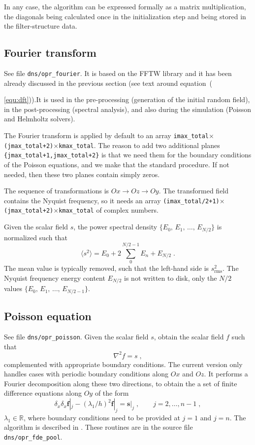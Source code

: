 In any case, the algorithm can be expressed formally as a matrix multiplication, the diagonals being calculated once in the initialization step and being stored in the filter-structure data.

\subsection{Fourier transform}

See file {\tt dns/opr\_fourier}. It is based on the FFTW library and it has been already discussed in the previous section (see text around equation~({\ref{equ:dft})).It is used in the pre-processing (generation of the   initial random field), in the post-processing (spectral analysis), and also during the simulation (Poisson and Helmholtz solvers).

The Fourier transform is applied by default to an array {\tt imax\_total}$\times${\tt(jmax\_total+2)}$\times${\tt kmax\_total}. The reason to add two additional planes {\tt \{jmax\_total+1,jmax\_total+2\}} is that we need them for the boundary conditions of the Poisson equations, and we make that the standard procedure. If not needed, then these two planes contain simply zeros.

The sequence of transformations is $Ox\rightarrow Oz\rightarrow Oy$. The transformed field contains the Nyquist frequency, so it needs an array {\tt(imax\_total/2+1)}$\times${\tt(jmax\_total+2)}$\times${\tt kmax\_total} of complex numbers.

Given the scalar field $s$, the power spectral density $\{E_0,\,E_1,\,\ldots,\,E_{N/2}\}$ is normalized such that
\begin{equation}
\langle s^2\rangle = E_0+2\sum_0^{N/2-1}E_n+E_{N/2} \;.
\end{equation}
The mean value is typically removed, such that the left-hand side is $s^2_\text{rms}$. The Nyquist frequency energy content $E_{N/2}$ is not written to disk, only the $N/2$ values $\{E_0,\,E_1,\,\ldots,\,E_{N/2-1}\}$.

\subsection{Poisson equation}

See file {\tt dns/opr\_poisson}. Given the scalar field $s$, obtain the scalar field $f$ such that
\begin{equation}
  \nabla^2 f= s \;,
\end{equation}
complemented with appropriate boundary conditions.  The current version only handles cases with periodic boundary conditions along $Ox$ and $Oz$. It performs a Fourier decomposition along these two directions, to obtain the a set of finite difference equations along $Oy$ of the form
\begin{equation}
  \delta_x \delta_x \mathbf{f}|_j - (\lambda_1/h)^2\mathbf{f}|_j=\mathbf{s}|_j
  \;,\qquad j=2,\ldots,n-1 \;,
\end{equation}
$\lambda_1\in\mathbb{R}$, where boundary conditions need to be provided at $j=1$ and $j=n$.  The algorithm is described in \cite{Mellado:2012}. These routines are in the source file {\tt dns/opr\_fde\_pool}.

}
